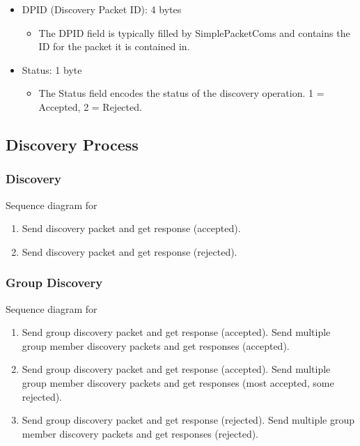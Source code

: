 \documentclass{article}
\begin{document}
\FloatBarrier

\begin{itemize}
    \item DPID (Discovery Packet ID): 4 bytes
    \begin{itemize}
        \item The DPID field is typically filled by SimplePacketComs and contains the ID for the
        packet it is contained in.
    \end{itemize}

    \item Status: 1 byte
    \begin{itemize}
        \item The Status field encodes the status of the discovery operation. 1 = Accepted, 2 =
        Rejected.
    \end{itemize}
\end{itemize}

\FloatBarrier

\subsection{Discovery Process}

\subsubsection{Discovery}

Sequence diagram for
\begin{enumerate}
    \item Send discovery packet and get response (accepted).
    \item Send discovery packet and get response (rejected).
\end{enumerate}

\subsubsection{Group Discovery}

Sequence diagram for
\begin{enumerate}
    \item Send group discovery packet and get response (accepted). Send multiple group member
    discovery packets and get responses (accepted).
    \item Send group discovery packet and get response (accepted). Send multiple group member
    discovery packets and get responses (most accepted, some rejected).
    \item Send group discovery packet and get response (rejected). Send multiple group member
    discovery packets and get responses (rejected).
\end{enumerate}
\end{document}
